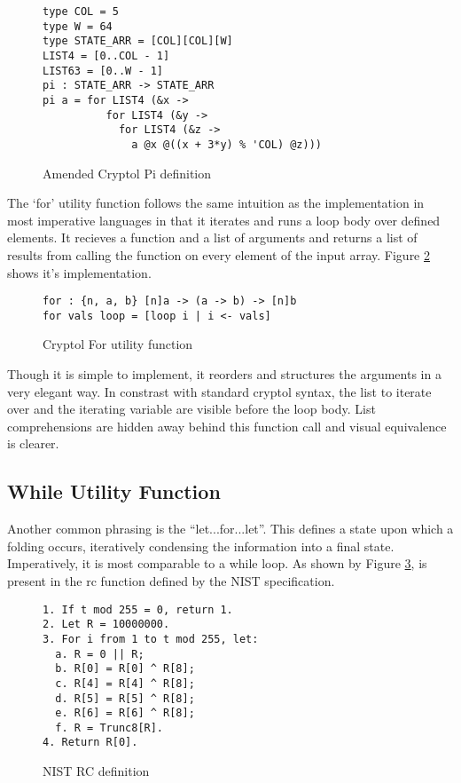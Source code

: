 \begin{figure}[h]
  \centering
\begin{lstlisting}[language=Cryptol]
type COL = 5 
type W = 64
type STATE_ARR = [COL][COL][W]
LIST4 = [0..COL - 1]
LIST63 = [0..W - 1]
pi : STATE_ARR -> STATE_ARR
pi a = for LIST4 (&x ->
          for LIST4 (&y -> 
            for LIST4 (&z -> 
              a @x @((x + 3*y) % 'COL) @z)))
\end{lstlisting}
\caption{Amended Cryptol Pi definition}
\label{fig:cryptolAmendedPi}
\end{figure}

The ‘for’ utility function follows the same intuition as the implementation in most 
imperative languages in that it iterates and runs a loop body over defined elements. 
It recieves a function and a list of arguments and returns a list of results from calling the function 
on every element of the input array. Figure \ref{fig:cryptolFor} shows it's implementation.

\begin{figure}[h]
  \centering
\begin{lstlisting}[language=Cryptol]
for : {n, a, b} [n]a -> (a -> b) -> [n]b
for vals loop = [loop i | i <- vals]
\end{lstlisting}
\caption{Cryptol For utility function}
\label{fig:cryptolFor}
\end{figure}

Though it is simple to implement, it reorders and structures the arguments in a very elegant way.
In constrast with standard cryptol syntax, the list to iterate over and the iterating 
variable are visible before the loop body. List comprehensions are hidden away behind this 
function call and visual equivalence is clearer.

\subsection{While Utility Function}
Another common phrasing is the “let...for...let”. This defines a state upon which a folding 
occurs, iteratively condensing the information into a final state. Imperatively, it is most 
comparable to a while loop. As shown by Figure \ref{fig:nistRC}, is present in the rc function 
defined by the NIST specification.

\begin{figure}[h]
  \centering
\begin{lstlisting}[basewidth = {.5em},basicstyle={\scriptsize}]
1. If t mod 255 = 0, return 1.
2. Let R = 10000000.
3. For i from 1 to t mod 255, let:
  a. R = 0 || R;
  b. R[0] = R[0] ^ R[8];
  c. R[4] = R[4] ^ R[8];
  d. R[5] = R[5] ^ R[8];
  e. R[6] = R[6] ^ R[8];
  f. R = Trunc8[R].
4. Return R[0].
\end{lstlisting}
\caption{NIST RC definition}
\label{fig:nistRC}
\end{figure}


